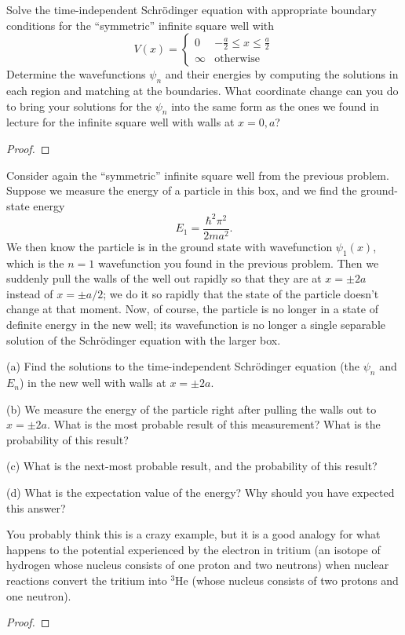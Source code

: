 \documentclass{article}
\begin{document}
\newpage

\begin{ques}\label{q6}
Solve the time-independent Schrödinger equation with appropriate boundary conditions
for the “symmetric” infinite square well with
\[
V(x) =
\begin{cases}
0 & -\frac{a}{2} \le x \le \frac{a}{2} \\
\infty & \text{otherwise}
\end{cases}
\]
Determine the wavefunctions $\psi_n$ and their energies by computing the solutions in each
region and matching at the boundaries. What coordinate change can you do to bring your
solutions for the $\psi_n$ into the same form as the ones we found in lecture for the infinite
square well with walls at $x = 0, a$?
\end{ques}

\begin{proof}
\end{proof}

\newpage

\begin{ques}\label{q7}
Consider again the “symmetric” infinite square well from the previous problem. Suppose
we measure the energy of a particle in this box, and we find the ground-state energy
\[
E_1 = \frac{\hbar^2\pi^2}{2ma^2}.
\]
We then know the particle is in the ground state with wavefunction $\psi_1(x)$,
which is the $n = 1$ wavefunction you found in the previous problem. Then we suddenly
pull the walls of the well out rapidly so that they are at $x = \pm 2a$ instead of $x = \pm a/2$; we do
it so rapidly that the state of the particle doesn’t change at that moment. Now, of course,
the particle is no longer in a state of definite energy in the new well; its wavefunction is no
longer a single separable solution of the Schrödinger equation with the larger box.

(a) Find the solutions to the time-independent Schrödinger equation (the $\psi_n$ and $E_n$) in
the new well with walls at $x = \pm 2a$.

(b) We measure the energy of the particle right after pulling the walls out to $x = \pm 2a$.
What is the most probable result of this measurement? What is the probability of
this result?

(c) What is the next-most probable result, and the probability of this result?

(d) What is the expectation value of the energy? Why should you have expected this
answer?

You probably think this is a crazy example, but it is a good analogy for what happens to
the potential experienced by the electron in tritium (an isotope of hydrogen whose nucleus
consists of one proton and two neutrons) when nuclear reactions convert the tritium into
${}^3$He (whose nucleus consists of two protons and one neutron).
\end{ques}

\begin{proof}
\end{proof}

\newpage
\end{document}
